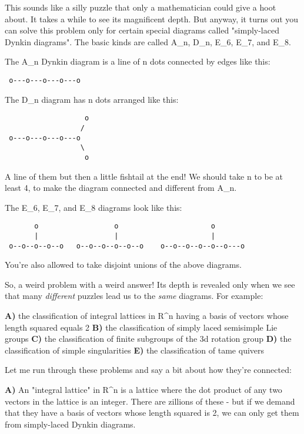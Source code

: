 This sounds like a silly puzzle that only a mathematician could give a 
hoot about.  It takes a while to see its magnificent depth.   But anyway, 
it turns out you can solve this problem only for certain special diagrams 
called "simply-laced Dynkin diagrams".  The basic kinds are called A_{n}, 
D_{n}, E_{6}, E_{7}, and E_{8}.

The A_{n} Dynkin diagram is a line of n dots connected by edges like this:

\begin{verbatim}
 o---o---o---o---o    
\end{verbatim}
    

The D_{n} diagram has n dots arranged like this:

\begin{verbatim}
                   o
                  /
 o---o---o---o---o
                  \
                   o
\end{verbatim}
    
A line of them but then a little fishtail at the end!  We should
take n to be at least 4, to make the diagram connected and different
from A_{n}.

The E_{6}, E_{7}, and E_{8} diagrams look like this:

\begin{verbatim}
       o                  o                      o
       |                  |                      |
 o--o--o--o--o   o--o--o--o--o--o    o--o--o--o--o--o---o
\end{verbatim}
    

You're also allowed to take disjoint unions of the above diagrams. 

So, a weird problem with a weird answer!   Its depth is revealed
only when we see that many \emph{different} puzzles lead us to the 
\emph{same}
diagrams.  For example:

\textbf{A)} the classification of integral lattices in R^{n} 
having a basis of vectors whose length squared equals 2
\textbf{B)} the classification of simply laced semisimple Lie groups 
\textbf{C)} the classification of finite subgroups of the 3d rotation group
\textbf{D)} the classification of simple singularities
\textbf{E)} the classification of tame quivers

Let me run through these problems and say a bit about how they're
connected:

\textbf{A)}
An "integral lattice" in R^{n} 
is a lattice where the dot product 
of any two vectors in the lattice is an integer.   There are zillions
of these - but if we demand that they have a basis of vectors whose
length squared is 2, we can only get them from simply-laced Dynkin 
diagrams.

